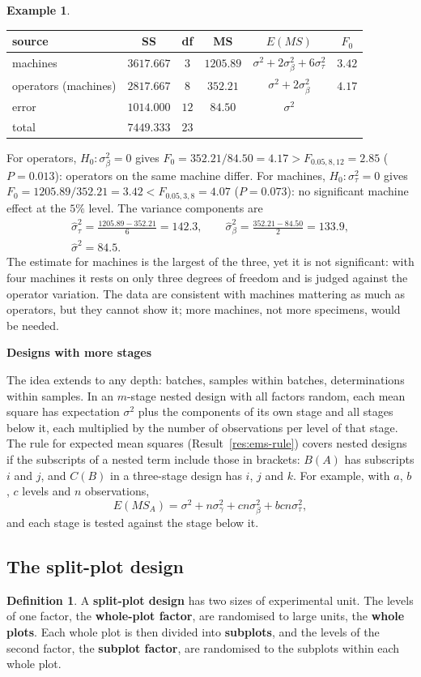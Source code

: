 \documentclass[11pt,a4paper]{article}
\numberwithin{equation}{section}
\theoremstyle{definition}
\newtheorem{defn}[thm]{Definition}
\newtheorem{exa}[thm]{Example}
\newcommand{\subhead}[1]{%
  \par\medskip\noindent\textbf{#1}\par\nobreak\smallskip}
\begin{document}
\begin{exa}
\begin{center}
\begin{tabular}{l|ccccc}
source & SS & df & MS & $E(MS)$ & $F_0$ \\
\hline
machines & $3617.667$ & $3$ & $1205.89$ & $\sigma^2 + 2\sigma^2_\beta + 6\sigma^2_\tau$ & $3.42$ \\
operators (machines) & $2817.667$ & $8$ & $352.21$ & $\sigma^2 + 2\sigma^2_\beta$ & $4.17$ \\
error & $1014.000$ & $12$ & $84.50$ & $\sigma^2$ & \\
\hline
total & $7449.333$ & $23$ & & &
\end{tabular}
\end{center}
For operators, $H_0 : \sigma^2_\beta = 0$ gives $F_0 = 352.21/84.50 = 4.17 > F_{0.05, 8, 12} = 2.85$ ($P = 0.013$): operators on the same machine differ. For machines, $H_0 : \sigma^2_\tau = 0$ gives
$F_0 = 1205.89/352.21 = 3.42 < F_{0.05, 3, 8} = 4.07$ ($P = 0.073$): no significant machine effect at the $5\%$ level. The variance components are
\begin{gather*}
\hat\sigma^2_\tau = \frac{1205.89 - 352.21}6 = 142.3 , \qquad \hat\sigma^2_\beta = \frac{352.21 - 84.50}2 = 133.9 , \\
\hat\sigma^2 = 84.5 .
\end{gather*}
The estimate for machines is the largest of the three, yet it is not significant: with four machines it rests on only three degrees of freedom and is
judged against the operator variation. The data are consistent with machines mattering as much as operators, but they cannot show it; more
machines, not more specimens, would be needed.
\end{exa}

\subhead{Designs with more stages}
The idea extends to any depth: batches, samples within batches, determinations within samples. In an $m$-stage nested design with all factors random,
each mean square has expectation $\sigma^2$ plus the components of its own stage and all stages below it, each multiplied by the number of observations
per level of that stage. The rule for expected mean squares (Result~\ref{res:ems-rule}) covers nested designs if the subscripts of a nested term include
those in brackets: $B(A)$ has subscripts $i$ and $j$, and $C(B)$ in a three-stage design has $i$, $j$ and $k$. For example, with $a$, $b$, $c$ levels and $n$
observations,
\[
E(MS_A) = \sigma^2 + n\sigma^2_\gamma + cn\sigma^2_\beta + bcn\sigma^2_\tau ,
\]
and each stage is tested against the stage below it.

\subsection{The split-plot design}
\begin{defn}
A \textbf{split-plot design} has two sizes of experimental unit. The levels of one factor, the \textbf{whole-plot factor}, are randomised to large units,
the \textbf{whole plots}. Each whole plot is then divided into \textbf{subplots}, and the levels of the second factor, the \textbf{subplot factor}, are randomised
to the subplots within each whole plot.
\end{defn}
\end{document}

